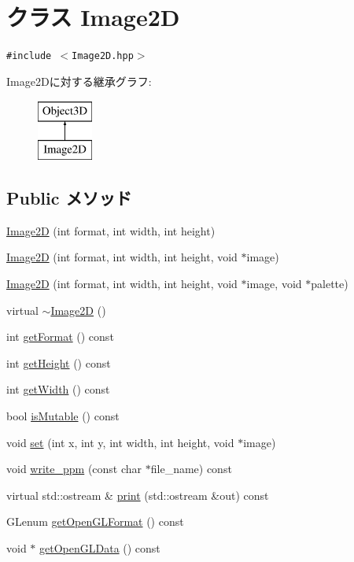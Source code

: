 \hypertarget{classm3g_1_1Image2D}{
\section{クラス Image2D}
\label{classm3g_1_1Image2D}
}
{\tt \#include $<$Image2D.hpp$>$}

Image2Dに対する継承グラフ:\begin{figure}[H]
\begin{center}
\leavevmode
\includegraphics[height=2cm]{classm3g_1_1Image2D}
\end{center}
\end{figure}
\subsection*{Public メソッド}
\begin{CompactItemize}
\item 
\hyperlink{classm3g_1_1Image2D_cea21be298c6584490d2b714c4b29d6b}{Image2D} (int format, int width, int height)
\item 
\hyperlink{classm3g_1_1Image2D_8cf9a47f24ed50fe66686c1117fb048c}{Image2D} (int format, int width, int height, void $\ast$image)
\item 
\hyperlink{classm3g_1_1Image2D_f498914ceac20ff9b1708c55ff1484e6}{Image2D} (int format, int width, int height, void $\ast$image, void $\ast$palette)
\item 
virtual \hyperlink{classm3g_1_1Image2D_7ac703fe7edbb053dd2246ea1bb43200}{$\sim$Image2D} ()
\item 
int \hyperlink{classm3g_1_1Image2D_c08e2752176d267cc4429d4d185975b8}{getFormat} () const 
\item 
int \hyperlink{classm3g_1_1Image2D_317329daf960a1759801c0f16d43d5a3}{getHeight} () const 
\item 
int \hyperlink{classm3g_1_1Image2D_f149cb053bc8b5fbc1364b5dbb934488}{getWidth} () const 
\item 
bool \hyperlink{classm3g_1_1Image2D_d687aabba553d1c66bfc253ec7e5bd05}{isMutable} () const 
\item 
void \hyperlink{classm3g_1_1Image2D_fe9ef1abefb9e92b38687e27c9004bdc}{set} (int x, int y, int width, int height, void $\ast$image)
\item 
void \hyperlink{classm3g_1_1Image2D_32ee5b2bcc9c7bf69b925413eeccb4bf}{write\_\-ppm} (const char $\ast$file\_\-name) const 
\item 
virtual std::ostream \& \hyperlink{classm3g_1_1Image2D_6fea17fa1532df3794f8cb39cb4f911f}{print} (std::ostream \&out) const 
\item 
GLenum \hyperlink{classm3g_1_1Image2D_7923da2fe82fee768ec9937a693e843c}{getOpenGLFormat} () const 
\item 
void $\ast$ \hyperlink{classm3g_1_1Image2D_b837b1bdda59947a6d818c448965c502}{getOpenGLData} () const 
\end{CompactItemize}
